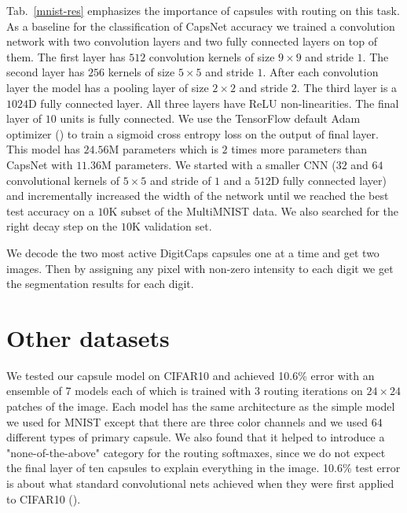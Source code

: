 \documentclass{article}
\begin{document}
Tab.~\ref{mnist-res} emphasizes the importance of capsules with routing on this task. As a baseline for the classification of CapsNet accuracy we trained a convolution network with two convolution layers and two fully connected layers on top of them. The first layer has $512$ convolution kernels of size $9\times9$ and stride $1$. The second layer has $256$ kernels of size $5\times5$ and stride $1$. After each convolution layer the model has a pooling layer of size $2\times2$ and stride $2$. The third layer is a $1024$D fully connected layer. All three layers have ReLU non-linearities. The final layer of $10$ units is fully connected. We use the TensorFlow default Adam optimizer (\cite{kingma2014adam}) to train a sigmoid cross entropy loss on the output of final layer. This model has $24.56$M parameters which is $2$ times more parameters than CapsNet with $11.36$M parameters. We started with a smaller CNN ($32$ and $64$ convolutional kernels of $5\times5$ and stride of $1$ and a $512$D fully connected layer) and incrementally increased the width of the network until we reached the best test accuracy on a $10$K subset of the MultiMNIST data. We also searched for the right decay step on the $10$K validation set.

We decode the two most active DigitCaps capsules one at a time and get two images. Then by assigning any pixel with non-zero intensity to each digit we get the segmentation results for each digit.
\section{Other datasets}

We tested our capsule model on CIFAR10 and achieved 10.6\% error with an ensemble of 7 models each of which is trained with $3$ routing iterations on $24 \times 24$ patches of the image. Each model has the same architecture as the simple model we used for MNIST except that there are three color channels and we used $64$ different types of primary capsule. We also found that it helped to introduce a "none-of-the-above" category for the routing softmaxes, since we do not expect the final layer of ten capsules to explain everything in the image. 10.6\% test error is about what standard convolutional nets achieved when they were first applied to CIFAR10 (\cite{zeiler2013stochastic}).
\end{document}
